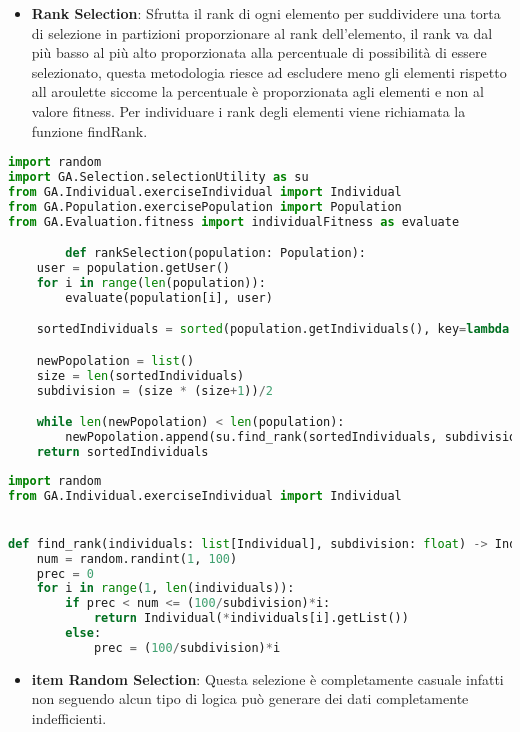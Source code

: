 \documentclass{article}
\begin{document}
\pagebreak
\begin{itemize}
\item\textbf{Rank Selection}: Sfrutta il rank di ogni elemento per suddividere una torta di selezione in partizioni proporzionare al rank dell'elemento, il rank va dal più basso al più alto proporzionata alla percentuale di possibilità di essere selezionato, questa metodologia riesce ad escludere meno gli elementi rispetto all aroulette siccome la percentuale è proporzionata agli elementi e non al valore fitness. Per individuare i rank degli elementi viene richiamata la funzione findRank.
\end{itemize}
\begin{lstlisting}[language=Python, breaklines, no caption]
import random
import GA.Selection.selectionUtility as su
from GA.Individual.exerciseIndividual import Individual
from GA.Population.exercisePopulation import Population
from GA.Evaluation.fitness import individualFitness as evaluate

        def rankSelection(population: Population):
    user = population.getUser()
    for i in range(len(population)):
        evaluate(population[i], user)

    sortedIndividuals = sorted(population.getIndividuals(), key=lambda ind: ind.fitness())

    newPopolation = list()
    size = len(sortedIndividuals)
    subdivision = (size * (size+1))/2

    while len(newPopolation) < len(population):
        newPopolation.append(su.find_rank(sortedIndividuals, subdivision))
    return sortedIndividuals
        \end{lstlisting}

        \begin{lstlisting}[language=Python, breaklines, no caption]
            import random
from GA.Individual.exerciseIndividual import Individual


def find_rank(individuals: list[Individual], subdivision: float) -> Individual:
    num = random.randint(1, 100)
    prec = 0
    for i in range(1, len(individuals)):
        if prec < num <= (100/subdivision)*i:
            return Individual(*individuals[i].getList())
        else:
            prec = (100/subdivision)*i
        \end{lstlisting}

\begin{itemize}
\item\textbf{item Random Selection}: Questa selezione è completamente casuale infatti non seguendo alcun tipo di logica può generare dei dati completamente indefficienti.
\end{itemize}
\end{document}
